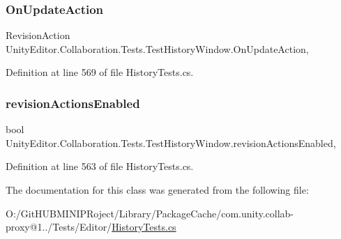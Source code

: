 \subsubsection{\texorpdfstring{OnUpdateAction}{OnUpdateAction}}
{\footnotesize\ttfamily Revision\+Action Unity\+Editor.\+Collaboration.\+Tests.\+Test\+History\+Window.\+On\+Update\+Action\hspace{0.3cm}{\ttfamily [get]}, {\ttfamily [set]}}



Definition at line 569 of file History\+Tests.\+cs.

\mbox{\label{class_unity_editor_1_1_collaboration_1_1_tests_1_1_test_history_window_a67ba9048c478720cc6a8c0add533232a}} 
\subsubsection{\texorpdfstring{revisionActionsEnabled}{revisionActionsEnabled}}
{\footnotesize\ttfamily bool Unity\+Editor.\+Collaboration.\+Tests.\+Test\+History\+Window.\+revision\+Actions\+Enabled\hspace{0.3cm}{\ttfamily [get]}, {\ttfamily [set]}}



Definition at line 563 of file History\+Tests.\+cs.



The documentation for this class was generated from the following file\+:\begin{DoxyCompactItemize}
\item 
O\+:/\+Git\+H\+U\+B\+M\+I\+N\+I\+P\+Roject/\+Library/\+Package\+Cache/com.\+unity.\+collab-\/proxy@1../\+Tests/\+Editor/\mbox{\hyperlink{_history_tests_8cs}{History\+Tests.\+cs}}\end{DoxyCompactItemize}
